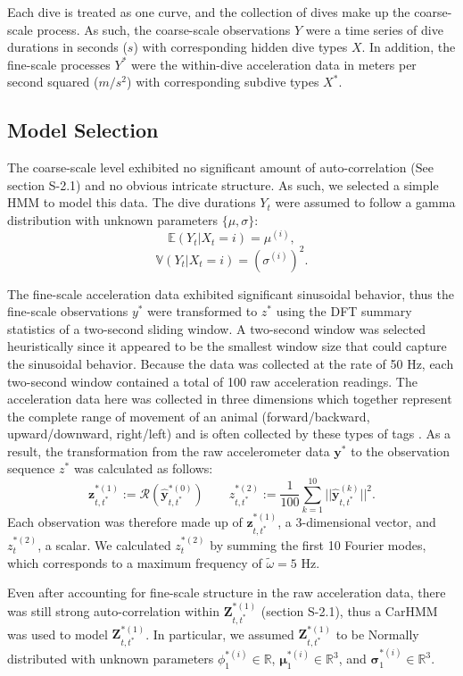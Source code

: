 Each dive is treated as one curve, and the collection of dives make up the coarse-scale process. As such, the coarse-scale observations $Y$ were a time series of dive durations in seconds ($s$) with corresponding hidden dive types $X$. In addition, the fine-scale processes $Y^*$ were the within-dive acceleration data in meters per second squared ($m/s^2$) with corresponding subdive types $X^*$.

\subsection{Model Selection}

The coarse-scale level exhibited no significant amount of auto-correlation (See section S-2.1) and no obvious intricate structure. As such, we selected a simple HMM to model this data. The dive durations $Y_t$ were assumed to follow a gamma distribution with unknown parameters $\{\mu,\sigma\}$:
$$\mathbb{E}(Y_t|X_t = i) = \mu^{(i)},$$
$$\mathbb{V}(Y_t|X_t = i) = \left(\sigma^{(i)}\right)^2.$$

The fine-scale acceleration data exhibited significant sinusoidal behavior, thus the fine-scale observations $y^*$ were transformed to $z^*$ using the DFT summary statistics of a two-second sliding window. A two-second window was selected heuristically since it appeared to be the smallest window size that could capture the sinusoidal behavior. Because the data was collected at the rate of 50 Hz, each two-second window contained a total of 100 raw acceleration readings. The acceleration data here was collected in three dimensions which together represent the complete range of movement of an animal (forward/backward, upward/downward, right/left) and is often collected by these types of tags \citep{Cade:2017,Fehlmann:2017,Wright:2017}. As a result, the transformation from the raw accelerometer data $\mathbf{y}^*$ to the observation sequence $z^*$ was calculated as follows:
%
$$\mathbf{z}_{t,t^*}^{*(1)} := \mathcal{R}\left(\hat{\mathbf{y}}^{*(0)}_{t,t^*}\right) \qquad z_{t,t^*}^{*(2)} := \frac{1}{100}\sum_{k=1}^{10}||\hat{\mathbf{y}}^{(k)}_{t,t^*}||^2.$$
%
Each observation was therefore made up of $\mathbf{z}_{t,t^*}^{*(1)}$, a 3-dimensional vector, and $z_t^{*(2)}$, a scalar. We calculated $z_t^{*(2)}$ by summing the first 10 Fourier modes, which corresponds to a maximum frequency of $\tilde \omega = 5$ Hz. 

Even after accounting for fine-scale structure in the raw acceleration data, there was still strong auto-correlation within $\mathbf{Z}^{*(1)}_{t,t^*}$ (section S-2.1), thus a CarHMM was used to model $\mathbf{Z}^{*(1)}_{t,t^*}$. In particular, we assumed $\mathbf{Z}^{*(1)}_{t,t^*}$ to be Normally distributed with unknown parameters $\phi_1^{*(i)} \in \mathbb{R}$, $\mathbf{\mu}_1^{*(i)} \in \mathbb{R}^3$, and $\mathbf{\sigma}_1^{*(i)} \in \mathbb{R}^3$.
%
%

